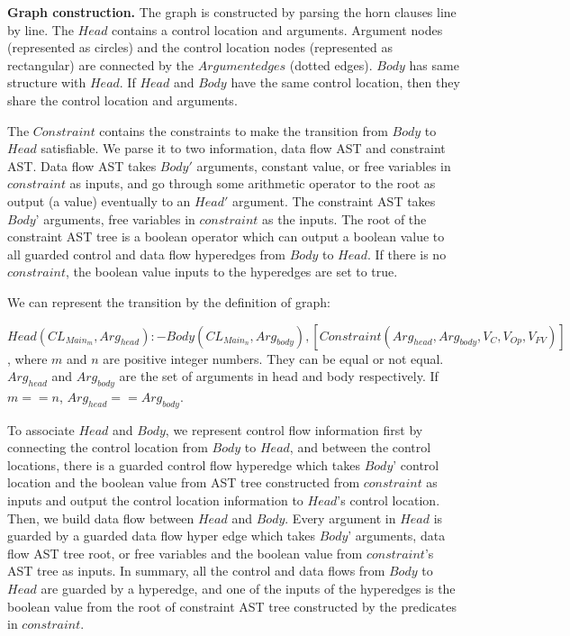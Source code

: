 \documentclass{article}
\begin{document}
\textbf{Graph construction.} The graph is constructed by parsing the horn clauses line by line. The $Head$ contains a control location and arguments. Argument nodes (represented as circles) and the control location nodes (represented as rectangular) are connected by the $Argument edges$ (dotted edges).
$Body$ has same structure with $Head$. 
If $Head$ and $Body$ have the same control location, then they share the control location and arguments. 
 
The $Constraint$ contains the constraints to make the transition from $Body$ to $Head$ satisfiable. We parse it to two information, data flow AST and constraint AST.  Data flow AST takes $Body'$ arguments, constant value, or free variables in $constraint$ as inputs, and go through some arithmetic operator to the root as output (a value) eventually to an $Head'$ argument. The constraint AST takes $Body$' arguments, free variables in $constraint$ as the inputs. The root of the constraint AST tree is a boolean operator which can output a boolean value to all guarded control and data flow hyperedges from $Body$ to $Head$. If there is no $constraint$, the boolean value inputs to the hyperedges are set to true.

We can represent the transition by the definition of graph:


$Head(CL_{Main_{m}},Arg_{head}):-Body(CL_{Main_{n}},Arg_{body}),[Constraint(Arg_{head},Arg_{body},V_{C},V_{Op},V_{FV})]$, where $m$ and $n$ are positive integer numbers. They can be equal or not equal. $Arg_{head}$ and $Arg_{body}$ are the set of arguments in head and body respectively. If $m==n$, $Arg_{head} == Arg_{body}$.

To associate $Head$ and $Body$, we represent control flow information first by connecting the control location from $Body$ to $Head$, and between the control locations, there is a guarded control flow hyperedge which takes $Body$' control location and the boolean value from AST tree constructed from $constraint$ as inputs and output the control location information to $Head$'s control location. Then, we build data flow between $Head$ and $Body$. Every argument in $Head$ is guarded by a guarded data flow hyper edge which takes $Body$' arguments, data flow AST tree root, or free variables and the boolean value from $constraint$'s AST tree as inputs. In summary, all the control and data flows from $Body$ to $Head$ are guarded by a hyperedge, and one of the inputs of the hyperedges is the boolean value from the root of constraint AST tree constructed by the predicates in $constraint$. 
\end{document}
